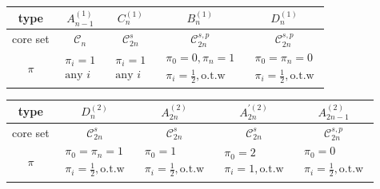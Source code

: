 \documentclass[10pt,a4paper]{amsart}
\numberwithin{equation}{section}
\begin{document}
\begin{center}\renewcommand{\arraystretch}{1.32}
\begin{tabular}{|c|c|c|c|c|}
\hline
type & $A_{n-1}^{(1)}$ & $C_{n}^{(1)}$ & $B_{n}^{(1)}$ & $D_{n}^{(1)}$ \\
\hline
core set & $\mathcal{C}_{n}$ & $\mathcal{C}_{2n}^{s}$ & $\mathcal{C}%
_{2n}^{s,p}$ & $\mathcal{C}_{2n}^{s,p}$ \\ \hline
$\pi $ & $%
\begin{array}{c}
\pi _{i}=1 \\
\text{any }i%
\end{array}%
$ & $%
\begin{array}{c}
\pi _{i}=1 \\
\text{any }i%
\end{array}%
$ & $%
\begin{array}{c}
\pi _{0}=0,\pi _{n}=1 \\
\pi _{i}=\frac{1}{2},\text{o.t.w}%
\end{array}%
$ & $%
\begin{array}{c}
\pi _{0}=\pi _{n}=0 \\
\pi _{i}=\frac{1}{2},\text{o.t.w}%
\end{array}%
$ \\ \hline
\end{tabular}
\vspace{2mm}

\begin{tabular}{|c|c|c|c|c|}
\hline
type & $D_{n}^{(2)}$ & $A_{2n}^{(2)}$ & $A_{2n}^{\prime (2)}$ & $%
A_{2n-1}^{(2)}$ \\ \hline
core set & $\mathcal{C}_{2n}^{s}$ & $\mathcal{C}_{2n}^{s}$ & $\mathcal{C}%
_{2n}^{s}$ & $\mathcal{C}_{2n}^{s,p}$ \\ \hline
$\pi $ & $%
\begin{array}{c}
\pi _{0}=\pi _{n}=1 \\
\pi _{i}=\frac{1}{2},\text{o.t.w}%
\end{array}%
$ & $%
\begin{array}{c}
\pi _{0}=1 \\
\pi _{i}=\frac{1}{2},\text{o.t.w}%
\end{array}%
$ & $%
\begin{array}{c}
\pi _{0}=2 \\
\pi _{i}=1,\text{o.t.w}%
\end{array}%
$ & $%
\begin{array}{c}
\pi _{0}=0 \\
\pi _{i}=\frac{1}{2},\text{o.t.w}%
\end{array}%
$ \\ \hline
\end{tabular}
\end{center}
\end{document}
